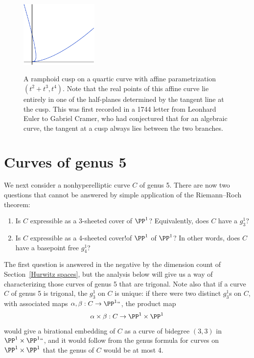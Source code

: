 \begin{figure}
\includegraphics[height=1.3in]{"main/ramphoid"}
\caption{A ramphoid cusp on a quartic curve with affine parametrization
$(t^2{+}t^3,t^4)$. Note that the real points of this affine curve lie
entirely in one of the half-planes determined by the tangent line
at the cusp. This was first recorded in a 1744 letter from Leonhard Euler to
Gabriel Cramer,
who had conjectured that for an algebraic curve, the
tangent at a cusp always lies between the two branches.}
%
%
\label{ramphoid}
\end{figure}
%

\section{Curves of genus 5}

We next consider a nonhyperelliptic curve $C$ of genus 5. There are
%
now two questions that cannot be answered by simple application of the
Riemann--Roch
theorem:

\begin{enumerate}
\item Is $C$ expressible as a
3-sheeted cover
%
of $\PP^1$?
Equivalently,
does $C$ have a
$g^1_3$?%
%
\item Is $C$ expressible as a
4-sheeted cover!of $\PP\sp 1$
of $\PP^1$?
In other words, does $C$ have a basepoint free
$g^1_4$?
%
\end{enumerate}

The first question is answered in the negative by the dimension count
of Section~\ref{Hurwitz spaces}, but the analysis below will give us a
way of characterizing those curves of genus 5 that are trigonal. Note
also that if a curve $C$ of genus 5 is trigonal, the $g^1_3$ on $C$ is
unique: if there were two distinct $g^1_3$s on $C$, with associated
maps $\alpha, \beta : C \to \PP^1` `$, the product map
$$
\alpha \times \beta : C \to \PP^1 \times \PP^1
$$
would give a
birational
%
embedding of $C$ as a curve of
bidegree $(3,3)$
%
in $\PP^1 \times \PP^1` `$, and it would follow from the genus formula
for curves on $\PP^1 \times \PP^1$ that the genus of $C$ would be at most 4.
%

